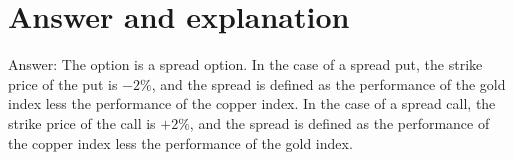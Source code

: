 \documentclass[11pt]{article}
\begin{document}
\section*{Answer and explanation}
Answer: The option is a spread option. In the case of a spread put, the strike price of the put is $-2 \%$, and the spread is defined as the performance of the gold index less the performance of the copper index. In the case of a spread call, the strike price of the call is $+2 \%$, and the spread is defined as the performance of the copper index less the performance of the gold index.
\end{document}

